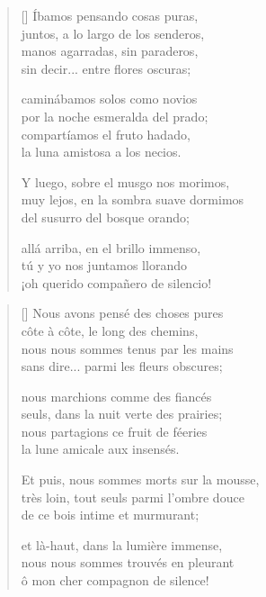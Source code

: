 



\settowidth{\versewidth}{Muy lejos, en la sombra suave dormimos}

\bigskip

\begin{verse}[\versewidth]
  Íbamos pensando cosas puras, \\
  juntos, a lo largo de los senderos, \\
  manos agarradas, sin paraderos, \\
  sin decir... entre flores oscuras;

  caminábamos solos como novios \\
  por la noche esmeralda del prado; \\
  compartíamos el fruto hadado, \\
  la luna amistosa a los necios.

  Y luego, sobre el musgo nos morimos, \\
  muy lejos, en la sombra suave dormimos \\
  del susurro del bosque orando;

  allá arriba, en el brillo immenso, \\
  tú y yo nos juntamos llorando \\
  ¡oh querido compañero de silencio!
\end{verse}

\newpage



\settowidth{\versewidth}{Très loin, tout seuls parmi l'ombre douce}

\bigskip

{\itshape
\begin{verse}[\versewidth]
  Nous avons pensé des choses pures \\
  côte à côte, le long des chemins, \\
  nous nous sommes tenus par les mains \\
  sans dire... parmi les fleurs obscures;

  nous marchions comme des fiancés \\
  seuls, dans la nuit verte des prairies; \\
  nous partagions ce fruit de féeries \\
  la lune amicale aux insensés.

  Et puis, nous sommes morts sur la mousse, \\
  très loin, tout seuls parmi l'ombre douce \\
  de ce bois intime et murmurant;

  et là-haut, dans la lumière immense, \\
  nous nous sommes trouvés en pleurant \\
  ô mon cher compagnon de silence!
\end{verse}
}
